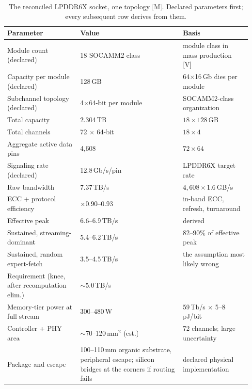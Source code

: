 \begin{table}[htbp]
  \centering
  \small
  \caption{The reconciled LPDDR6X socket, one topology [M]. Declared parameters first; every subsequent row derives from them.}
  \label{tab:designpoint}
  \begin{tabular}{p{52mm}p{30mm}p{52mm}}
    \toprule
    Parameter & Value & Basis \\
    \midrule
    Module count (declared) & 18 SOCAMM2-class & module class in mass production [V]~\cite{skhynixSocamm} \\
    Capacity per module (declared) & 128\,GB & 64$\times$16\,Gb dies per module \\
    Subchannel topology (declared) & 4$\times$64-bit per module & SOCAMM2-class organization \\
    \midrule
    Total capacity & 2.304\,TB & $18 \times 128$\,GB \\
    Total channels & 72 $\times$ 64-bit & $18 \times 4$ \\
    Aggregate active data pins & 4,608 & $72 \times 64$ \\
    Signaling rate (declared) & 12.8\,Gb/s/pin & LPDDR6X target rate \\
    Raw bandwidth & 7.37\,TB/s & $4{,}608 \times 1.6$\,GB/s \\
    ECC + protocol efficiency & $\times$0.90--0.93 & in-band ECC, refresh, turnaround \\
    Effective peak & 6.6--6.9\,TB/s & derived \\
    Sustained, streaming-dominant & 5.4--6.2\,TB/s & 82--90\% of effective peak \\
    Sustained, random expert-fetch & 3.5--4.5\,TB/s & the assumption most likely wrong \\
    Requirement (knee, after recomputation elim.) & $\sim$5.0\,TB/s & \cite{riken-study} \\
    Memory-tier power at full stream & 300--480\,W & 59\,Tb/s $\times$ 5--8\,pJ/bit \\
    Controller + PHY area & $\sim$70--120\,mm$^2$ (est.) & 72 channels; large uncertainty \\
    Package and escape & 100--110\,mm organic substrate, peripheral escape; silicon bridges at the corners if routing fails & declared physical implementation \\
    \bottomrule
  \end{tabular}
\end{table}

